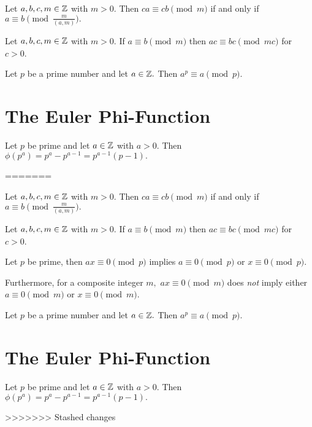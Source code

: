 \documentclass[letterpaper, 11 pt]{ximera}
\begin{document}
\begin{prop*}[Proposition 2.5]\label{prop:equiv-gcd}
    Let $a,b,c,m\in\mathbb Z$ with $m>0.$ Then $ca\equiv cb\pmod{m}$ if and only if $a\equiv b\pmod{\tfrac{m}{(a,m)}}.$
\end{prop*}


\begin{lem*}\label{ex-equiv-upmod}
    Let $a,b,c,m\in\mathbb Z$ with $m>0.$ If $a\equiv b \pmod{m}$ then $ac\equiv bc \pmod{mc}$ for $c>0$.
\end{lem*}


\begin{cor*}[Corollary 2.15]\label{cor:a_power_prime_mod}
    Let $p$ be a prime number and let $a\in\mathbb Z.$ Then $a^p\equiv a\pmod{p}.$
\end{cor*}

\section{The Euler Phi-Function}

\begin{thm*}[Theorem 3.3]\label{thm:phi-prime-power}
    Let $p$ be prime and let $a\in\mathbb Z$ with $a>0.$ Then $\phi(p^a)=p^a-p^{a-1}=p^{a-1}(p-1).$
\end{thm*}
=======


\begin{proposition}[Proposition 2.5]\label{prop:equiv-gcd}
    Let $a,b,c,m\in\mathbb Z$ with $m>0.$ Then $ca\equiv cb\pmod{m}$ if and only if $a\equiv b\pmod{\tfrac{m}{(a,m)}}.$
\end{proposition}


\begin{lemma}\label{ex:equiv-upmod}
    Let $a,b,c,m\in\mathbb Z$ with $m>0.$ If $a\equiv b \pmod{m}$ then $ac\equiv bc \pmod{mc}$ for $c>0$.
\end{lemma}


\begin{proposition}\label{prop:zero-divisors}
    Let $p$ be prime, then $ax\equiv 0\pmod{p}$ implies $a\equiv 0\pmod{p}$ or $x\equiv 0\pmod{p}.$ 

    Furthermore, for a composite integer $m,$ $ax\equiv 0\pmod{m}$ does \emph{not} imply either $a\equiv 0\pmod{m}$ or $x\equiv 0\pmod{m}.$ 
\end{proposition}

\begin{corollary}[Corollary 2.15]\label{cor:a_power_prime_mod}
    Let $p$ be a prime number and let $a\in\mathbb Z.$ Then $a^p\equiv a\pmod{p}.$
\end{corollary}

\section{The Euler Phi-Function}

\begin{theorem}[Theorem 3.3]\label{thm:phi-prime-power}
    Let $p$ be prime and let $a\in\mathbb Z$ with $a>0.$ Then $\phi(p^a)=p^a-p^{a-1}=p^{a-1}(p-1).$
\end{theorem}
>>>>>>> Stashed changes
\end{document}
